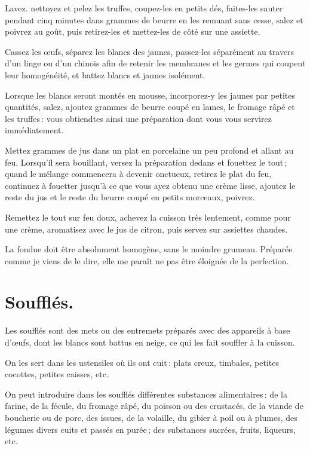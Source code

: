 Lavez. nettoyez et pelez les truffes, coupez-les en petits dés, faites-les
sauter pendant cinq minutes dans {\mmm} grammes de beurre en les remuant
sans cesse, salez et poivrez au goût, puis retirez-les et mettez-les de côté
sur une assiette.

Cassez les œufs, séparez les blancs des jaunes, passez-les séparément au
travers d'un linge ou d'un chinois afin de retenir les membranes et les germes
qui coupent leur homogénéité, et battez blancs et jaunes isolément.

Lorsque les blancs seront montés en mousse, incorporez-y les jaunes par petites
quantités, salez, ajoutez {\mmm} grammes de beurre coupé en lames, le
fromage râpé et les truffes : vous obtiendtes ainsi une préparation dont vous
vous servirez immédiatement.

Mettez {\mmm} grammes de jus dans un plat en porcelaine un peu profond et
allant au feu. Lorsqu'il sera bouillant, versez la préparation dedans et
fouettez le tout ; quand le mélange commencera à devenir onctueux, retirez le
plat du feu, continuez à fouetter jusqu'à ce que vous ayez obtenu une crème
lisse, ajoutez le reste du jus et le reste du beurre coupé en petits morceaux,
poivrez.

Remettez le tout sur feu doux, achevez la cuisson très lentement, comme pour
une crème, aromatisez avec le jus de citron, puis servez sur assiettes chaudes.

La fondue doit être absolument homogène, sans le moindre grumeau. Préparée
comme je viens de le dire, elle me paraît ne pas être éloignée de la
perfection.

\section*{\centering Soufflés.}

Les soufflés sont des mets ou des entremets préparés avec des appareils à base
d'œufs, dont les blancs sont battus en neige, ce qui les fait souffler à la
cuisson.

On les sert dans les ustensiles où ils ont cuit : plats creux, timbales, petites
cocottes, petites caisses, etc.

On peut introduire dans les soufflés différentes substances alimentaires : de
la farine, de la fécule, du fromage râpé, du poisson ou des crustacés, de la
viande de boucherie ou de porc, des issues, de la volaille, du gibier à poil ou
à plumes, des légumes divers cuits et passés en purée ; des substances sucrées,
fruits, liqueurs, etc.

